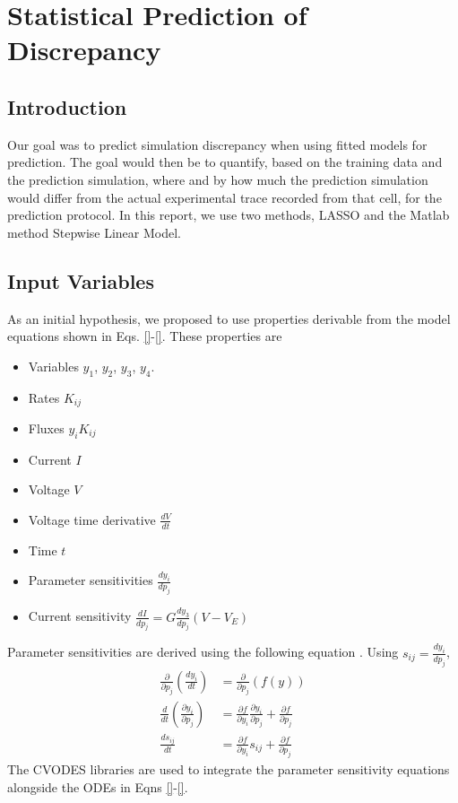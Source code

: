 \documentclass[11pt,a4paper,oneside]{article}
\begin{document}
\section{Statistical Prediction of Discrepancy}

\subsection{Introduction}

Our goal was to predict simulation discrepancy when using fitted models for prediction. The goal would then be to quantify, based on the training data and the prediction simulation, where and by how much the prediction simulation would differ from the actual experimental trace recorded from that cell, for the prediction protocol. In this report, we use two methods, LASSO and the Matlab method Stepwise Linear Model.

\subsection{Input Variables}

As an initial hypothesis, we proposed to use properties derivable from the model equations shown in Eqs. \eqref{}-\eqref{}. These properties are
\begin{itemize}
\item Variables $y_1$, $y_2$, $y_3$, $y_4$.
\item Rates $K_{ij}$
\item Fluxes $y_i K_{ij}$
\item Current $I$
\item Voltage $V$
\item Voltage time derivative $\frac{dV}{dt}$
\item Time $t$
\item Parameter sensitivities $\frac{dy_i}{dp_j}$
\item Current sensitivity $\frac{dI}{dp_j} = G \frac{dy_3}{dp_j} (V-V_E) $
\end{itemize}

Parameter sensitivities are derived using the following equation \cite{}. Using $s_{ij} = \frac{dy_i}{dp_j}$,
\begin{align}
	\frac{\partial}{\partial p_j} ( \frac{dy_i}{dt} ) & = \frac{\partial}{\partial p_j} (f( y ) ) \\
	\frac{d}{dt}(\frac{\partial y_i}{\partial p_j})   & = \frac{\partial f}{ \partial y_i}\frac{\partial y_i}{ \partial p_j} + \frac{\partial f}{ \partial p_j} \\
	\frac{d s_{ij}}{dt} & = \frac{\partial f}{ \partial y_i} s_{ij} + \frac{\partial f}{ \partial p_j}
\end{align}
The CVODES libraries are used to integrate the parameter sensitivity equations alongside the ODEs in Eqns \eqref{}-\eqref{}.
\end{document}
